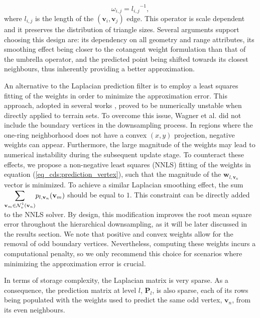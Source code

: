 \documentclass[graybox]{svmult}
\begin{document}
	\begin{equation}
	\omega_{i,j} = {l_{i,j}}^{-1}, 
	\label{eq_cds:fujiwara}
	\end{equation}
	where $l_{i,j}$ is the length of the $(\mathbf{v}_i,\mathbf{v}_j)$ edge. This operator is scale dependent and it preserves the distribution of triangle sizes. Several arguments support choosing this design are: its dependency on all geometry and range attributes, its smoothing effect being closer to the cotangent weight formulation than that of the umbrella operator, and the predicted point being shifted towards its closest neighbours, thus inherently providing a better approximation.
	
	An alternative to the Laplacian prediction filter is to employ a least squares fitting of the weights in order to minimize the approximation error. This approach, adopted in several works \cite{Wagner2005,Martinez2011}, proved to be numerically unstable when directly applied to terrain sets. To overcome this issue, Wagner et al. \cite{Wagner2005} did not include the boundary vertices in the downsampling process. In regions where the one-ring neighborhood does not have a convex  $(x,y)$ projection, negative weights can appear. Furthermore, the large magnitude of the weights may lead to numerical instability during the subsequent update stage. To counteract these effects, we propose  a non-negative least squares (NNLS) fitting of the weights in equation (\ref{eq_cds:prediction_vertex}), such that
	the magnitude of the $\mathbf{w}_{l, \mathbf{v}_n}$ vector is minimized. To achieve a similar Laplacian smoothing effect, the sum $\mathlarger{\sum}_{\mathbf{v}_m \in \mathcal{N}_v^1(\mathbf{v}_n)}{ p_{l, \mathbf{v}_n}(\mathbf{v}_m)}$ should be equal to $1$. This constraint can be directly added to the NNLS solver. By design, this modification improves the root mean square error throughout the hierarchical downsampling, as it will be later discussed in the results section. We note that positive and convex weights allow for the removal of odd boundary vertices. Nevertheless, computing these weights incurs a computational penalty, so we only recommend this choice for scenarios where minimizing the approximation error is crucial.
	
	In terms of storage complexity,  the Laplacian matrix is very sparse. As a consequence, the prediction matrix at level $l$, $\mathbf{P}_l$, is also sparse, each of its rows being populated with the weights used to predict the same odd vertex,
	$\mathbf{v}_n$, from its even neighbours.
	
\end{document}
